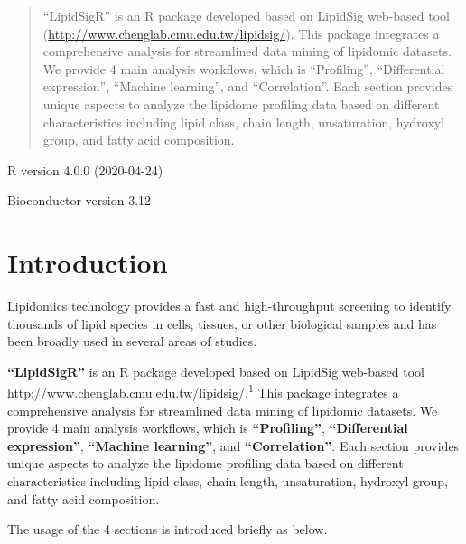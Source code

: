 \documentclass[]{article}
\author[1]{Wei-Chung Cheng}
\affil[1]{China Medical University}
\date{7 April 2022}
\begin{document}
\maketitle
\begin{abstract}
``LipidSigR'' is an R package developed based on LipidSig web-based tool (\url{http://www.chenglab.cmu.edu.tw/lipidsig/}). This package integrates a comprehensive analysis for streamlined data mining of lipidomic datasets. We provide 4 main analysis workflows, which is ``Profiling'', ``Differential expression'', ``Machine learning'', and ``Correlation''. Each section provides unique aspects to analyze the lipidome profiling data based on different characteristics including lipid class, chain length, unsaturation, hydroxyl group, and fatty acid composition.
\end{abstract}


{
\setcounter{tocdepth}{2}
\tableofcontents
\newpage
}
R version 4.0.0 (2020-04-24)

Bioconductor version 3.12

\RequirePackage[]{/usr/local/lib64/R/library/BiocStyle/resources/tex/Bioconductor}
\AtBeginDocument{}

\hypertarget{introduction}{%
\section*{Introduction}\label{introduction}}

Lipidomics technology provides a fast and high-throughput screening to identify thousands of lipid species in cells, tissues, or other biological samples and has been broadly used in several areas of studies.

\textbf{``LipidSigR''} is an R package developed based on LipidSig web-based tool \url{http://www.chenglab.cmu.edu.tw/lipidsig/}.\textsuperscript{1} This package integrates a comprehensive analysis for streamlined data mining of lipidomic datasets. We provide 4 main analysis workflows, which is \textbf{``Profiling''}, \textbf{``Differential expression''}, \textbf{``Machine learning''}, and \textbf{``Correlation''}. Each section provides unique aspects to analyze the lipidome profiling data based on different characteristics including lipid class, chain length, unsaturation, hydroxyl group, and fatty acid composition.

The usage of the 4 sections is introduced briefly as below.
\end{document}
